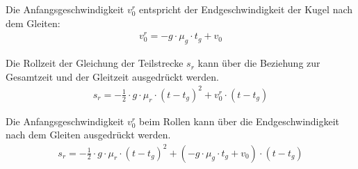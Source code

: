 Die Anfangsgeschwindigkeit $v^r_0$ entspricht der Endgeschwindigkeit der Kugel nach dem Gleiten:
\begin{align}
    v^r_0 = - g \cdot \mu_g \cdot t_g + v_0
\end{align}

Die Rollzeit der Gleichung der Teilstrecke $s_r$ kann über die Beziehung zur Gesamtzeit und der Gleitzeit ausgedrückt werden.
\begin{align}
    s_r = - \frac{1}{2} \cdot g \cdot \mu_r \cdot (t - t_g)^2 + v^r_0 \cdot (t - t_g)
\end{align}

Die Anfangsgeschwindigkeit $v^r_0$ beim Rollen kann über die Endgeschwindigkeit nach dem Gleiten ausgedrückt werden.
\begin{align}
    s_r = - \frac{1}{2} \cdot g \cdot \mu_r \cdot (t - t_g)^2 + (-g \cdot \mu_g \cdot t_g + v_0) \cdot (t - t_g)
\end{align}

